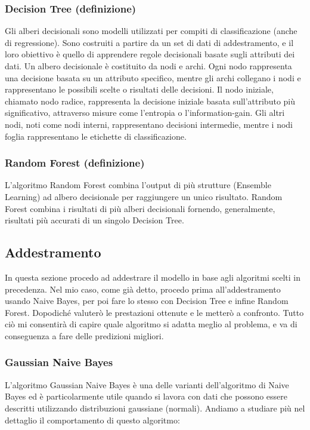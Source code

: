 \documentclass{article}
\begin{document}
\begin{titlepage}
        \subsubsection{Decision Tree (definizione)}
        Gli alberi decisionali sono modelli utilizzati per compiti di classificazione (anche di regressione). Sono costruiti a partire da un set di dati di addestramento, e il loro obiettivo è quello di apprendere regole decisionali basate sugli attributi dei dati.
        Un albero decisionale è costituito da nodi e archi. Ogni nodo rappresenta una decisione basata su un attributo specifico, mentre gli archi collegano i nodi e rappresentano le possibili scelte o risultati delle decisioni. Il nodo iniziale, chiamato nodo radice, rappresenta la decisione iniziale basata sull'attributo più significativo, attraverso misure come l’entropia
        o l’information-gain. Gli altri nodi, noti come nodi interni, rappresentano decisioni intermedie, mentre i nodi foglia rappresentano le etichette di classificazione.

        \subsubsection{Random Forest (definizione)}
         L'algoritmo Random Forest combina l’output di più strutture
         (Ensemble Learning) ad albero decisionale per raggiungere un unico risultato.  Random Forest combina i risultati di più alberi decisionali fornendo,
         generalmente, risultati più accurati di un singolo Decision Tree.
         
        \subsection{Addestramento}
         In questa sezione procedo ad addestrare il modello in base agli algoritmi scelti in precedenza. Nel mio caso, come già detto, procedo prima all’addestramento usando Naive Bayes, per poi fare lo stesso con Decision Tree e infine Random Forest. Dopodiché valuterò le
         prestazioni ottenute e le metterò a confronto. Tutto ciò mi consentirà di capire quale algoritmo si adatta meglio al problema, e va di conseguenza a fare delle predizioni migliori.
        
        \newpage
        \subsubsection{Gaussian Naive Bayes}
         L'algoritmo Gaussian Naive Bayes è una delle varianti dell'algoritmo di Naive Bayes ed è particolarmente utile quando si lavora con dati che possono essere descritti utilizzando distribuzioni gaussiane (normali). Andiamo a studiare più nel dettaglio il comportamento di questo algoritmo:


\end{titlepage}
\end{document}
